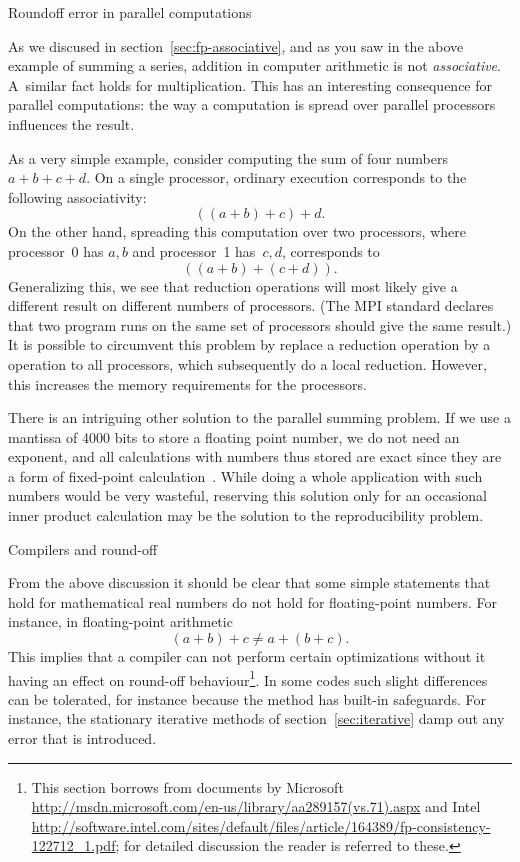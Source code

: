  {Roundoff error in parallel computations}
\label{sec:roundoff-parallel}

As we discused in section~\ref{sec:fp-associative}, and as you saw
in the above example of summing a series, addition in
computer arithmetic is not \emph{associative}. A~similar fact holds for
multiplication.  This has an interesting consequence for parallel
computations: the way a computation is spread over parallel processors
influences the result. 

As a very simple example, consider computing the sum of four numbers $a+b+c+d$.
On a single processor, ordinary execution corresponds to the following associativity:
\[ ((a+b)+c)+d. \]
On the other hand, spreading this computation over two processors, 
where processor~0 has $a,b$ and processor~1 has~$c,d$,
corresponds to
\[ ((a+b)+(c+d)). \]
Generalizing this, we see that reduction operations will most likely
give a different result on different numbers of processors. (The MPI
standard declares that two program runs on the same set of processors
should give the same result.)
It is possible to circumvent this problem by replace a reduction operation
by a  operation to all processors, which subsequently 
do a local reduction. However, this increases the memory requirements for the 
processors.

There is an intriguing other solution to the parallel summing problem.
If we use a mantissa of 4000 bits to store a floating point number, we
do not need an exponent, and all calculations with numbers thus stored
are exact since they are a form of fixed-point
calculation~\cite{Kulish:dotproduct,Kulisch:2011:VFE}.  While doing a
whole application with such numbers would be very wasteful, reserving
this solution only for an occasional inner product calculation may be
the solution to the reproducibility problem.


 {Compilers and round-off}
\label{sec:round-compile}

From the above discussion it should be clear that some simple statements
that hold for mathematical real numbers do not hold for floating-point numbers.
For instance, in floating-point arithmetic 
\[ (a+b)+c\not=a+(b+c).\]
This implies that a compiler can not perform certain optimizations
without it having an effect on round-off behaviour\footnote{This
section borrows from documents by
Microsoft \url{http://msdn.microsoft.com/en-us/library/aa289157(vs.71).aspx}
and
Intel \url{http://software.intel.com/sites/default/files/article/164389/fp-consistency-122712_1.pdf};
for detailed discussion the reader is referred to these.}.  In some
codes such slight differences can be tolerated, for instance because
the method has built-in safeguards. For instance, the stationary
iterative methods of section~\ref{sec:iterative} damp out any error
that is introduced. 

